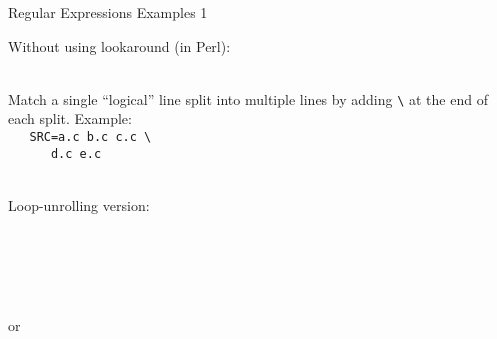 \documentclass[11pt, a4paper, landscape]{scrartcl}
\newcommand{\regex}[1]{\texttt{#1}}
\newcommand{\cregex}[1]{\colorbox{gray!30}{\regex{#1}}}
\newcommand{\bs}{\textbackslash}
\newcommand{\reshortexample}[1]{\cregex{}}
\newcommand{\relongexample}[1]{\regex{}}
\begin{document}
\begin{cheatsheet}{Regular Expressions Examples 1}
\begin{col2}
Without using lookaround (in Perl):\\
\relongexample{./thousandsep_2.tex}\\


Match a single ``logical'' line split into multiple lines by adding \cregex{\bs}
at the end of each split. Example:\\
\texttt{%
\mbox{}\ \ SRC=a.c b.c c.c \bs\\
\mbox{}\ \ \ \ \ \ d.c e.c}

\reshortexample{./cont_line.tex}\\
Loop-unrolling version:\\
\relongexample{./cont_line_lu.tex}

\end{col2}

\begin{col3}


\relongexample{./date.tex}\\


\reshortexample{./time12.tex}\\


\reshortexample{./time24_1.tex}\\
or\\
\reshortexample{./time24_2.tex}\\

\end{col3}

\end{cheatsheet}

\newpage
\end{document}
